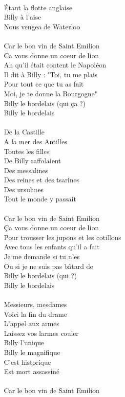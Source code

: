 \\Étant la flotte anglaise
\\Billy à l'aise
\\Nous vengea de Waterloo
\\\\Car le bon vin de Saint Emilion
\\Ca vous donne un coeur de lion
\\Ah qu'il était content le Napoléon
\\Il dit à Billy : "Toi, tu me plais
\\Pour tout ce que tu as fait
\\Moi, je te donne la Bourgogne"
\\Billy le bordelais (qui ça ?)
\\Billy le bordelais
\\\\De la Castille
\\A la mer des Antilles
\\Toutes les filles
\\De Billy raffolaient
\\Des messalines
\\Des reines et des tsarines
\\Des ursulines
\\Tout le monde y passait
\\\\Car le bon vin de Saint Emilion
\\Ça vous donne un coeur de lion
\\Pour trousser les jupons et les cotillons
\\Avec tous les enfants qu'il a fait
\\Je me demande si tu n'es
\\Ou si je ne suis pas bâtard de
\\Billy le bordelais (qui ?)
\\Billy le bordelais
\\\\Messieurs, mesdames
\\Voici la fin du drame
\\L'appel aux armes
\\Laissez vos larmes couler
\\Billy l'unique
\\Billy le magnifique
\\C'est historique
\\Est mort assassiné
\\\\Car le bon vin de Saint Emilion
